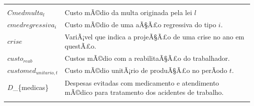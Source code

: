 \documentclass[]{article}
\begin{document}
\begin{longtable}[]{@{}ll@{}}
\begin{minipage}[t]{0.87\columnwidth}
\end{minipage}\tabularnewline
\begin{minipage}[t]{0.07\columnwidth}\raggedright\strut
\(Cmedmulta_{l}\)\strut
\end{minipage} & \begin{minipage}[t]{0.87\columnwidth}\raggedright\strut
Custo mÃ©dio da multa originada pela lei \(l\)\strut
\end{minipage}\tabularnewline
\begin{minipage}[t]{0.07\columnwidth}\raggedright\strut
\(cmedregressiva_{i}\)\strut
\end{minipage} & \begin{minipage}[t]{0.87\columnwidth}\raggedright\strut
Custo mÃ©dio de uma aÃ§Ã£o regressiva do tipo \(i\).\strut
\end{minipage}\tabularnewline
\begin{minipage}[t]{0.07\columnwidth}\raggedright\strut
\(crise\)\strut
\end{minipage} & \begin{minipage}[t]{0.87\columnwidth}\raggedright\strut
VariÃ¡vel que indica a projeÃ§Ã£o de uma crise no ano em questÃ£o.\strut
\end{minipage}\tabularnewline
\begin{minipage}[t]{0.07\columnwidth}\raggedright\strut
\(custo_{reab}\)\strut
\end{minipage} & \begin{minipage}[t]{0.87\columnwidth}\raggedright\strut
Custos mÃ©dio com a reabilitaÃ§Ã£o do trabalhador.\strut
\end{minipage}\tabularnewline
\begin{minipage}[t]{0.07\columnwidth}\raggedright\strut
\(customed_{unitario, t}\)\strut
\end{minipage} & \begin{minipage}[t]{0.87\columnwidth}\raggedright\strut
Custo mÃ©dio unitÃ¡rio de produÃ§Ã£o no perÃ­odo \(t\).\strut
\end{minipage}\tabularnewline
\begin{minipage}[t]{0.07\columnwidth}\raggedright\strut
\(D\)\_\{medicas\}\strut
\end{minipage} & \begin{minipage}[t]{0.87\columnwidth}\raggedright\strut
Despesas evitadas com medicamento e atendimento mÃ©dico para tratamento
dos acidentes de trabalho.\strut
\end{minipage}\tabularnewline
\begin{minipage}[t]{0.07\columnwidth}\raggedright\strut

\end{minipage}
\end{longtable}
\end{document}
